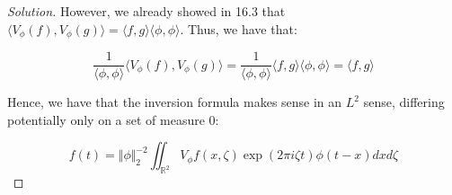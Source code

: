 \documentclass[10pt]{article}
\begin{document}
\begin{proof}[Solution]
However, we already showed in 16.3 that $\langle V_\phi(f), V_\phi(g) \rangle = \langle f, g\rangle \langle \phi, \phi \rangle $. Thus, we have that:

$$ \frac{1}{ \langle \phi, \phi \rangle } \langle V_\phi(f), V_\phi(g) \rangle  = \frac{1}{ \langle \phi, \phi \rangle } \langle f, g \rangle \langle \phi, \phi \rangle = \langle f, g \rangle $$

Hence, we have that the inversion formula makes sense in an $L^2$ sense, differing potentially only on a set of measure 0:

$$ f(t) = \Vert \phi \Vert_2^{-2} \iint_{\mathbb{R}^2} V_\phi f(x, \zeta) \exp(2 \pi i \zeta t) \phi(t - x) dx d\zeta $$ 

\end{proof}
\end{document}
